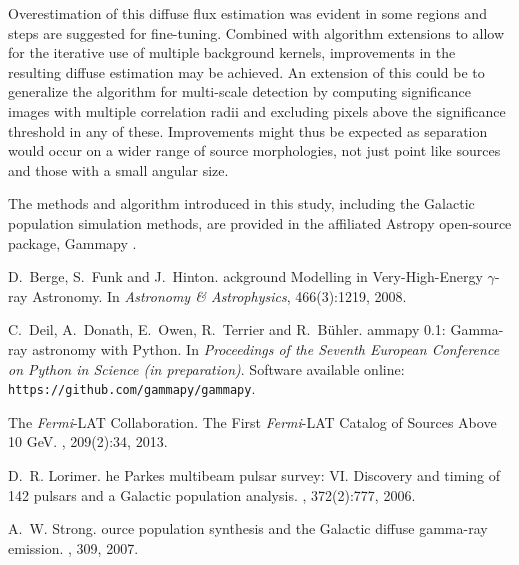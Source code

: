 \documentclass{PoS}
\begin{document}
Overestimation of this diffuse flux estimation was evident in some regions and steps are suggested for fine-tuning. Combined with algorithm extensions to allow for the iterative use of multiple background kernels, improvements in the resulting diffuse estimation may be achieved. An extension of this could be to generalize the algorithm for multi-scale detection by computing significance images with multiple correlation radii and excluding pixels above the significance threshold in any of these. Improvements might thus be expected as separation would occur on a wider range of source morphologies, not just point like sources and those with a small angular size.

The methods and algorithm introduced in this study, including the Galactic population simulation methods, are provided in the affiliated Astropy open-source package, Gammapy \cite{Deil}.

\begin{thebibliography}{99}

D.~Berge, S.~Funk and J.~Hinton.
ackground {M}odelling in {V}ery-{H}igh-{E}nergy $\gamma$-ray {A}stronomy.
\newblock In {\em {A}stronomy \& {A}strophysics}, 466(3):1219, 2008.

C.~Deil, A.~Donath, E.~Owen, R.~Terrier and R.~B{\"{u}}hler.
ammapy {0.1}: {G}amma-ray astronomy with {P}ython.
\newblock In {\em {P}roceedings of the {S}eventh {E}uropean {C}onference on
  {P}ython in {S}cience (in preparation)}.
\newblock Software available online: {\verb|https://github.com/gammapy/gammapy|}.

{The \textit{Fermi}-LAT Collaboration}.
\newblock The {F}irst {\textit{Fermi}-LAT} {C}atalog of {S}ources {A}bove 10 {GeV}.
, 209(2):34, 2013.

D.~R. Lorimer.
he {P}arkes multibeam pulsar survey: {VI.} {D}iscovery and timing
  of 142 pulsars and a {G}alactic population analysis.
, 372(2):777,
  2006.

A.~W. Strong.
ource population synthesis and the {G}alactic diffuse gamma-ray
  emission.
, 309, 2007.


\end{thebibliography}
\end{document}
